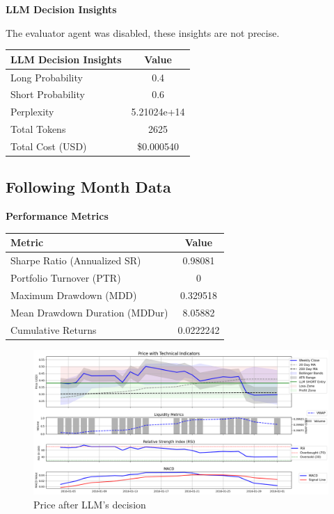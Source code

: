 \documentclass[8pt]{scrartcl}
\begin{document}
\textbf{LLM Decision Insights}

The evaluator agent was disabled, these insights are not precise.

\begin{longtable}{l c}
\toprule
\textbf{LLM Decision Insights} & \textbf{Value} \\
\midrule
Long Probability & 0.4 \\
Short Probability & 0.6 \\
Perplexity & 5.21024e+14   \\
\midrule
Total Tokens & 2625 \\
Total Cost (USD) & \$0.000540 \\
\bottomrule
\end{longtable}

\subsection*{Following Month Data}

\textbf{Performance Metrics}

\begin{longtable}{l c}
\toprule
\textbf{Metric} & \textbf{Value} \\
\midrule
Sharpe Ratio (Annualized SR) & 0.98081 \\
Portfolio Turnover (PTR) & 0 \\
Maximum Drawdown (MDD) & 0.329518 \\
Mean Drawdown Duration (MDDur) & 8.05882 \\
Cumulative Returns & 0.0222242 \\
\bottomrule
\end{longtable}


\begin{figure}[H]
    \centering
    \includegraphics[width=1\linewidth]{judge_reviews/META_M_gpt-4o-mini//2016-01-01/llm_Price_with_Technical_Indicators.png}
    \caption{Price after LLM's decision}
\end{figure}
\end{document}
